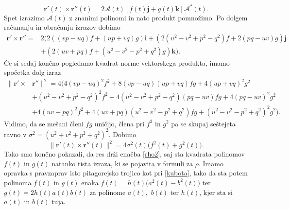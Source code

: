 \documentclass[12pt,a4paper,twoside]{article}
\theoremstyle{definition} %
\theoremstyle{plain} %
\numberwithin{equation}{section}  %
\newcommand{\rV}{\mathbf{r}}
\newcommand{\iV}{\mathbf{i}}
\newcommand{\jV}{\mathbf{j}}
\newcommand{\kV}{\mathbf{k}}
\newcommand{\AQ}{\mathcal{A}}
\begin{document}
\begin{equation}
	\label{drtddr}
	\rV'(t)\times\rV''(t)=2\AQ(t)[f(t)\jV+g(t)\kV]\AQ^*(t).
\end{equation}
Spet izrazimo $\AQ(t)$ z znanimi polinomi in nato produkt pomnožimo. Po dolgem računanju in obračanju izrazov dobimo
\begin{align*}
	\label{drtddr}
	\rV'\times\rV''=&2 \big (2((vp-uq)f+(up+vq)g)\iV+(2(u^2-v^2+p^2-q^2)f+2(pq-uv)g)\jV \\
	&+(2(uv+pq)f+(u^2-v^2-p^2+q^2)g)\kV \big ).
\end{align*}
Če si sedaj končno pogledamo kvadrat norme vektorskega produkta, imamo spočetka dolg izraz
\begin{align*}
	\lVert\rV'\times&\rV''\rVert^2=4 \Big( 4(vp-uq)^2f^2+8(vp-uq)(up+vq)fg+4(up+vq)^2g^2\\
	&+(u^2-v^2+p^2-q^2)^2f^2+4(u^2-v^2+p^2-q^2)(pq-uv)fg+4(pq-uv)^2g^2\\
	&+4(uv+pq)^2f^2+4(uv+pq)(u^2-v^2-p^2+q^2)fg+(u^2-v^2-p^2+q^2)^2g^2 \Big).
\end{align*}
Vidimo, da se mešani členi $fg$ uničijo, člena pri $f^2$ in $g^2$ pa se skupaj seštejeta ravno v $\sigma^2=(u^2+v^2+p^2+q^2)^2.$ Dobimo
\begin{equation}
	\lVert\rV'(t)\times\rV''(t)\rVert^2=4\sigma^2(t)\big(f^2(t)+g^2(t)\big).
\end{equation}
Tako smo končno pokazali, da res drži enačba \eqref{rho2}, saj sta kvadrata polinomov $f(t)$ in $g(t)$ natanko tista izraza, ki se pojavita v formuli za $\rho.$ Imamo opravka s pravzaprav isto pitagorejsko trojico kot pri \eqref{kubota}, tako da sta potem polinoma $f(t)$ in $g(t)$ enaka $f(t)=h(t)\big(a^2(t)-b^2(t)\big)$ ter $g(t)=2h(t)a(t)b(t)$ za polinome $a(t),$ $b(t)$ ter $h(t)$, kjer sta si $a(t)$ in $b(t)$ tuja.
\end{document}
